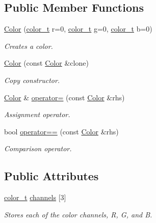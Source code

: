 \subsection*{Public Member Functions}
\begin{DoxyCompactItemize}
\item 
\mbox{\hyperlink{structlife_1_1_color_a828b52fdeb6cea04ae182dea36272538}{Color}} (\mbox{\hyperlink{structlife_1_1_color_ab392ce7ebd8204f1447c7e296dde9a17}{color\+\_\+t}} r=0, \mbox{\hyperlink{structlife_1_1_color_ab392ce7ebd8204f1447c7e296dde9a17}{color\+\_\+t}} g=0, \mbox{\hyperlink{structlife_1_1_color_ab392ce7ebd8204f1447c7e296dde9a17}{color\+\_\+t}} b=0)
\begin{DoxyCompactList}\small\item\em Creates a color. \end{DoxyCompactList}\item 
\mbox{\hyperlink{structlife_1_1_color_a4c5b4ec3378b240824d16ae0e7870b44}{Color}} (const \mbox{\hyperlink{structlife_1_1_color}{Color}} \&clone)
\begin{DoxyCompactList}\small\item\em Copy constructor. \end{DoxyCompactList}\item 
\mbox{\hyperlink{structlife_1_1_color}{Color}} \& \mbox{\hyperlink{structlife_1_1_color_a36338f7acd471d208faeffae1e24bcf2}{operator=}} (const \mbox{\hyperlink{structlife_1_1_color}{Color}} \&rhs)
\begin{DoxyCompactList}\small\item\em Assignment operator. \end{DoxyCompactList}\item 
bool \mbox{\hyperlink{structlife_1_1_color_a5c68002aa56cf5932c14ff2f1bf7f24b}{operator==}} (const \mbox{\hyperlink{structlife_1_1_color}{Color}} \&rhs)
\begin{DoxyCompactList}\small\item\em Comparison operator. \end{DoxyCompactList}\end{DoxyCompactItemize}
\subsection*{Public Attributes}
\begin{DoxyCompactItemize}
\item 
\mbox{\hyperlink{structlife_1_1_color_ab392ce7ebd8204f1447c7e296dde9a17}{color\+\_\+t}} \mbox{\hyperlink{structlife_1_1_color_acbb18a06aeb0d05c8e9477a25fbd32bf}{channels}} \mbox{[}3\mbox{]}
\begin{DoxyCompactList}\small\item\em Stores each of the color channels, R, G, and B. \end{DoxyCompactList}\end{DoxyCompactItemize}
